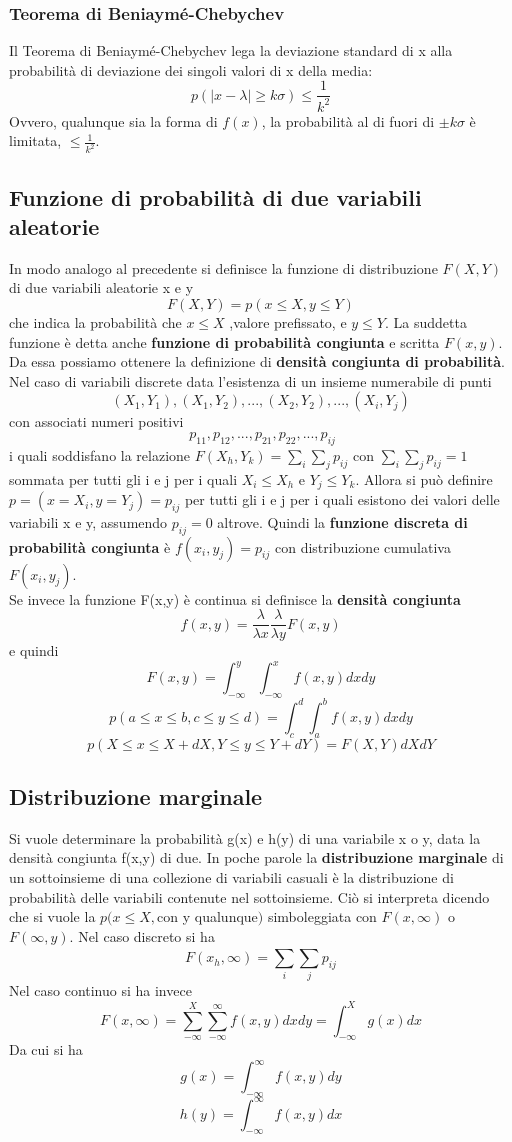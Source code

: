 \subsubsection{Teorema di Beniaymé-Chebychev}
Il Teorema di Beniaymé-Chebychev lega la deviazione standard di x alla probabilità di deviazione dei singoli valori di x della media:
\[ p(\left | x- \lambda \right | \geq k\sigma) \leq \frac{1}{k^2}   \]
 Ovvero, qualunque sia la forma di $f(x)$, la probabilità al di fuori di $\pm k \sigma$ è limitata, $\leq \frac{1}{k^2}$.
 
 \subsection{Funzione di probabilità di due variabili aleatorie} \label{subsec:prob_congiunta}
 In modo analogo al precedente si definisce la funzione di distribuzione $F(X,Y)$ di due variabili aleatorie x e y
 \[ F(X,Y) = p(x \leq X, y \leq Y)\]
 che indica la probabilità che $x \leq X$ ,valore prefissato, e $y \leq Y$. La suddetta funzione è detta anche \textbf{funzione di probabilità congiunta} e scritta $F(x,y)$.
 Da essa possiamo ottenere la definizione di \textbf{densità congiunta di probabilità}. Nel caso di variabili discrete data l'esistenza di un insieme numerabile di punti 
 \[ (X_1, Y_1), (X_1,Y_2),...,(X_2,Y_2),...,(X_i,Y_j)\]
 con associati numeri positivi 
 \[\ p_{11},p_{12},...,p_{21},p_{22},...,p_{ij}\]
\noindent i quali soddisfano la relazione $F(X_h, Y_k) = \sum_{i}^{}\sum_{j}^{}p_{ij}$ con $\sum_{i}^{}\sum_{j}^{}p_{ij}=1$ sommata per tutti gli i e j per i quali $X_i \leq X_h$ e $Y_j \leq Y_k$.
Allora si può definire $p = (x=X_i, y=Y_j) = p_{ij}$ per tutti gli i e j per i quali esistono dei valori delle variabili x e y, assumendo $p_{ij} = 0$ altrove. Quindi la \textbf{funzione discreta di probabilità congiunta} è $f(x_i, y_j) = p_{ij}$ con distribuzione cumulativa $F(x_i,y_j)$.\\
Se invece la funzione F(x,y) è continua si definisce la \textbf{densità congiunta}
\[f(x,y) = \dfrac{\lambda}{\lambda x} \dfrac{\lambda}{\lambda y} F(x,y) \] e quindi
\[F(x,y) = \int_{-\infty}^{y}\int_{-\infty}^{x} f(x,y) dxdy\]
\[ p(a \leq x\leq b , c \leq y \leq d) = \int_{c}^{d}\int_{a}^{b} f(x,y) dxdy \]
\[ p( X \leq x \leq X + dX , Y \leq y \leq Y +dY) = F(X,Y) dXdY\]

\subsection{Distribuzione marginale}
Si vuole determinare la probabilità g(x) e h(y) di una variabile x o y, data la densità congiunta f(x,y) di due. In poche parole la \textbf{distribuzione marginale} di un sottoinsieme di una collezione di variabili casuali è la distribuzione di probabilità delle variabili contenute nel sottoinsieme. Ciò si interpreta dicendo che si vuole la $p(x \leq X, $con y qualunque$)$ simboleggiata con $F(x, \infty)$ o $F(\infty,y)$.
Nel caso discreto si ha 
\[F(x_h, \infty) = \sum_{i}^{}\sum_{j}^{}p_{ij}\] 
Nel caso continuo si ha invece 
\[ F(x,\infty)=\sum_{-\infty}^{X} \sum_{-\infty}^{\infty} f(x,y) dxdy= \int_{-\infty}^{X} g(x) dx \]
Da cui si ha 
\[g(x) = \int_{-\infty}^{\infty}f(x,y) dy \]
\[h(y) = \int_{-\infty}^{\infty}f(x,y) dx \]

